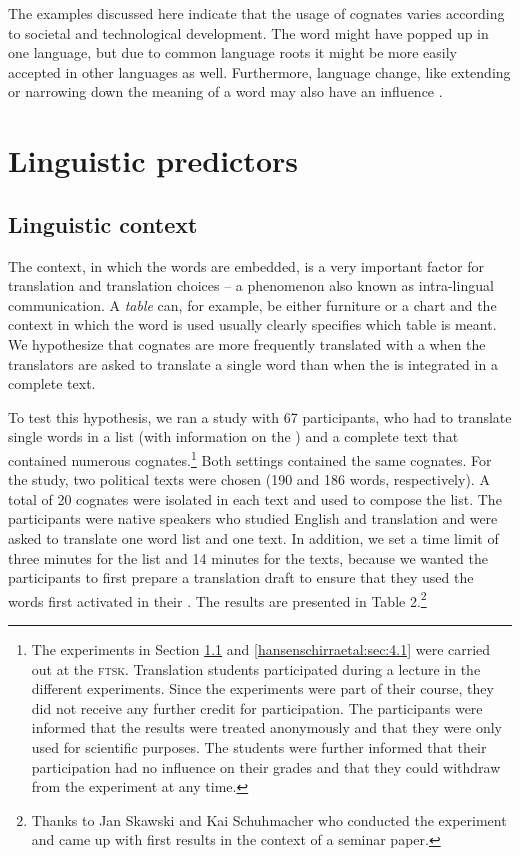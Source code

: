 \documentclass[output=paper]{LSP/langsci}
\begin{document}
The examples discussed here indicate that the usage of cognates varies according to societal and technological development. The word might have popped up in one language, but due to common language roots it might be more easily accepted in other languages as well. Furthermore, language change, like extending or narrowing down the meaning of a word may also have an influence \citep{Koselleck1979}.

\section{Linguistic predictors} \label{hansenschirraetal:sec:3}
\subsection{Linguistic context} \label{hansenschirraetal:sec:3.1}
The context, in which the words are embedded, is a very important factor for translation and translation choices – a phenomenon also known as intra-lingual communication. A \textit{table} can, for example, be either furniture or a chart and the context in which the word is used usually clearly specifies which table is meant. We hypothesize that cognates are more frequently translated with a  when the translators are asked to translate a single word than when the  is integrated in a complete text. 

To test this hypothesis, we ran a study with 67 participants, who had to translate single words in a list (with information on the ) and a complete text that contained numerous cognates.\footnote{The experiments in Section \ref{hansenschirraetal:sec:3.1} and \ref{hansenschirraetal:sec:4.1} were carried out at the \textsc{ftsk}. Translation students participated during a lecture in the different experiments. Since the experiments were part of their course, they did not receive any further credit for participation. The participants were informed that the results were treated anonymously and that they were only used for scientific purposes. The students were further informed that their participation had no influence on their grades and that they could withdraw from the experiment at any time.} Both settings contained the same cognates. For the study, two political texts were chosen (190 and 186 words, respectively). A total of 20 cognates were isolated in each text and used to compose the  list. The participants were  native speakers who studied English and translation and were asked to translate one word list and one text. In addition, we set a time limit of three minutes for the list and 14 minutes for the texts, because we wanted the participants to first prepare a translation draft to ensure that they used the words first activated in their . The results are presented in Table 2.\footnote{Thanks to Jan Skawski and Kai Schuhmacher who conducted the experiment and came up with first results in the context of a seminar paper.}
\end{document}
